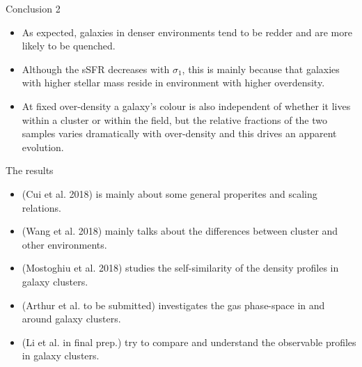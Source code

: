 \documentclass[aspectratio=43]{beamer}
\begin{document}
\begin{frame}{Conclusion 2}
  \begin{itemize}
    \item As expected, galaxies in denser environments tend to be redder and are more likely to be quenched.
    \item Although the sSFR decreases with $\sigma_1$, this is mainly because that galaxies with higher stellar mass reside in environment with higher overdensity. 
    \item At fixed over-density a galaxy's colour is also independent of whether it lives within a cluster or within the field, but the relative fractions of the two samples varies dramatically with over-density and this drives an apparent evolution.
  \end{itemize}
    \begin{center}
    \hyperlink{lastpage}{}    
  \end{center}
\end{frame}

\begin{frame}
  \begin{center}
    {\Huge The results} \\
    \bigskip
  \end{center}
  
  \begin{itemize}
      \item \hyperlink{intropaper}{} (Cui et al. 2018) is mainly about some general properites and scaling relations.
      \item \hyperlink{Wang}{} (Wang et al. 2018)  mainly talks about the differences between cluster and other environments.
      \item \hyperlink{Mostoghiu}{} (Mostoghiu et al. 2018) studies the self-similarity of the density profiles in galaxy clusters.
      \item \hyperlink{Arthur}{} (Arthur et al. to be submitted) investigates the gas phase-space in and around galaxy clusters.
      \item \hyperlink{Li}{} (Li et al. in final prep.) try to compare and understand the observable profiles in galaxy clusters.
  \end{itemize}
\end{frame}
\end{document}
